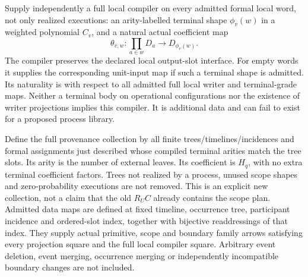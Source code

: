 \documentclass[11pt]{article}
\begin{document}
Supply independently a full local compiler on every admitted formal local word, not only realized executions: an arity-labelled terminal shape $\phi_v(w)$ in a weighted polynomial $C_v$, and a natural actual coefficient map
\[
 \theta_{v,w}:\prod_{a\in w}D_a\longrightarrow D_{\phi_v(w)}.
\]
The compiler preserves the declared local output-slot interface. For empty words it supplies the corresponding unit-input map if such a terminal shape is admitted. Its naturality is with respect to all admitted full local writer and terminal-grade maps. Neither a terminal body on operational configurations nor the existence of writer projections implies this compiler. It is additional data and can fail to exist for a proposed process library.

Define the full provenance collection by all finite trees/timelines/incidences and formal assignments just described whose compiled terminal arities match the tree slots. Its arity is the number of external leaves. Its coefficient is $H_q$, with no extra terminal coefficient factors. Trees not realized by a process, unused scope shapes and zero-probability executions are not removed. This is an explicit new collection, not a claim that the old $R_UC$ already contains the scope plan. Admitted data maps are defined at fixed timeline, occurrence tree, participant incidence and ordered-slot index, together with bijective readdressings of that index. They supply actual primitive, scope and boundary family arrows satisfying every projection square and the full local compiler square. Arbitrary event deletion, event merging, occurrence merging or independently incompatible boundary changes are not included.
\end{document}
